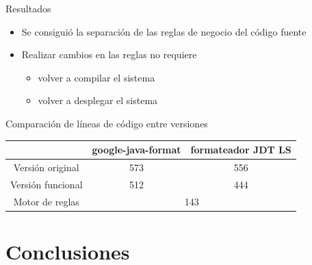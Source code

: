 \documentclass[10pt]{beamer}
\begin{document}
\begin{frame}{Resultados}
    \begin{itemize}
        \item Se consiguió la separación de las reglas de negocio del código fuente
        \item Realizar cambios en las reglas no requiere
            \begin{itemize}
                \item volver a compilar el sistema
                \item volver a desplegar el sistema
            \end{itemize}
    \end{itemize}
    \begin{block}{Comparación de líneas de código entre versiones}
        \begin{table}
            \centering
            \begin{tabular}{|c|c|c|}
                \hline
                & google-java-format & formateador JDT LS \\ \hline
                Versión original & 573 & 556 \\ \hline
                Versión funcional & 512 & 444 \\ \hline
                Motor de reglas & \multicolumn{2}{c|}{143} \\ \hline
            \end{tabular}
        \end{table}
    \end{block}
\end{frame}

\section{Conclusiones}
\end{document}
